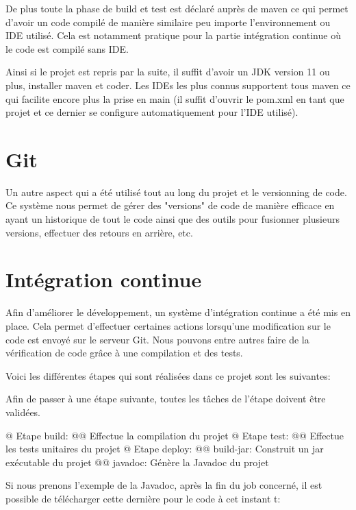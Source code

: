 \documentclass[final, noposter]{polytech/polytech}
\begin{document}
		De plus toute la phase de build et test est déclaré auprès de maven ce qui permet d'avoir un code compilé de manière similaire peu importe l'environnement ou IDE utilisé.
		Cela est notamment pratique pour la partie intégration continue où le code est compilé sans IDE.
		
		Ainsi si le projet est repris par la suite, il suffit d'avoir un JDK version 11 ou plus, installer maven et coder.
		Les IDEs les plus connus supportent tous maven ce qui facilite encore plus la prise en main (il suffit d'ouvrir le pom.xml en tant que projet et ce dernier se configure automatiquement pour l'IDE utilisé).
	
		
	\section{Git}
		Un autre aspect qui a été utilisé tout au long du projet et le versionning de code.
		Ce système nous permet de gérer des "versions" de code de manière efficace en ayant un historique de tout le code ainsi que des outils pour fusionner plusieurs versions, effectuer des retours en arrière, etc.
		
	\section{Intégration continue} 
		Afin d'améliorer le développement, un système d'intégration continue a été mis en place.
	Cela permet d'effectuer certaines actions lorsqu'une modification sur le code est envoyé sur le serveur Git.
	Nous pouvons entre autres faire de la vérification de code grâce à une compilation et des tests.
	
	Voici les différentes étapes qui sont réalisées dans ce projet sont les suivantes:
	
	Afin de passer à une étape suivante, toutes les tâches de l'étape doivent être validées.
		
	\begin{easylist}[itemize]
		@ Etape build:
		@@ Effectue la compilation du projet
		@ Etape test:
		@@ Effectue les tests unitaires du projet
		@ Etape deploy:
		@@ build-jar: Construit un jar exécutable du projet
		@@ javadoc: Génère la Javadoc du projet
	\end{easylist}
	
	Si nous prenons l'exemple de la Javadoc, après la fin du job concerné, il est possible de télécharger cette dernière pour le code à cet instant t:
	
\end{document}
